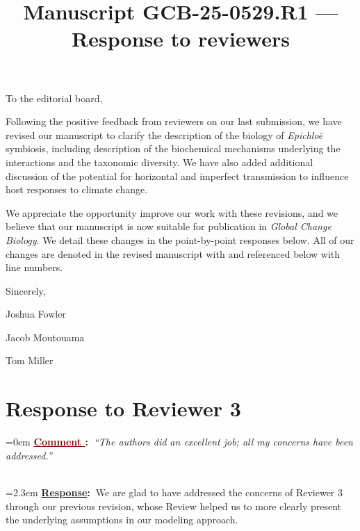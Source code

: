\documentclass[12pt]{article}
\newcounter{cN}
\newcommand{\comment}[1]{
	\vspace{2em}
	\refstepcounter{cN} %
	\noindent \hangindent=0em \textbf{\textcolor{Maroon}{\uline{Comment \thecN}:~}}\emph{``#1''}
	}
\newcommand{\response}[1]{
	\\[0.25em]
	\hangindent=2.3em \textbf{\textcolor{NavyBlue}{\uline{Response}:~}}#1
	}
\newcommand{\revise}[1]{{\color{Mahogany}{#1}}}
\newcommand{\linesref}[2]{
		\\[0.25em]
	\hangindent=2.3em {\color{Mahogany} Line(s): \ref{#1} - \ref{#2}}
}
\begin{document}
\title{Manuscript GCB-25-0529.R1 --- Response to reviewers}

\maketitle
\noindent To the editorial board,


Following the positive feedback from reviewers on our last submission, we have revised our manuscript to clarify the description of the biology of \emph{Epichloë} symbiosis, including description of the biochemical mechanisms underlying the interactions and the taxonomic diversity. 
We have also added additional discussion of the potential for horizontal and imperfect transmission to influence host responses to climate change.

We appreciate the opportunity improve our work with these revisions, and we believe that our manuscript is now suitable for publication in \emph{Global Change Biology}.
We detail these changes in the point-by-point responses below.
All of our changes are denoted in the revised manuscript with \revise{Mahogany font} and referenced below with line numbers. 




\vspace{2em}
Sincerely,

Joshua Fowler

Jacob Moutouama

Tom Miller



\newpage

\section{Response to Reviewer 3}
\vspace{-2em}





\comment{The authors did an excellent job; all my concerns have been addressed.}
\response{We are glad to have addressed the concerns of Reviewer 3 through our previous revision, whose Review helped us to more clearly present the underlying assumptions in our modeling approach.}
\end{document}
